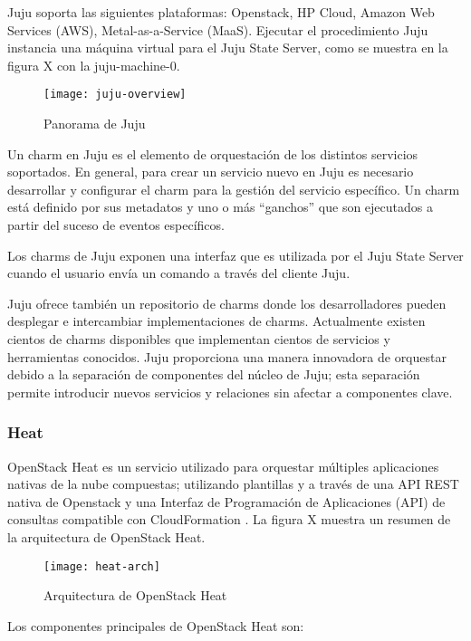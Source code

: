 Juju soporta las siguientes plataformas: Openstack, HP Cloud, Amazon Web Services (AWS), Metal-as-a-Service (MaaS). Ejecutar el procedimiento Juju instancia una máquina virtual  para el Juju State Server, como se muestra en la figura X con la juju-machine-0.


\begin{figure}[H]
    \centering
    \texttt{[image: juju-overview]}
    \caption{ Panorama de Juju \protect\cite{Metsch2013-et}}
    \label{fig:juju-overview}
\end{figure}

Un charm en Juju es el elemento de orquestación de los distintos servicios soportados. En general, para crear un servicio nuevo en Juju es necesario desarrollar y configurar el charm para la gestión del servicio específico. Un charm está definido por sus metadatos y uno o más “ganchos” que son ejecutados a partir del suceso de eventos específicos. 

Los charms de Juju exponen una interfaz que es utilizada por el Juju State Server cuando el usuario envía un comando a través del cliente Juju. 

Juju ofrece también un repositorio de charms donde los desarrolladores pueden desplegar e intercambiar implementaciones de charms. Actualmente existen cientos de charms disponibles que implementan cientos de servicios y herramientas conocidos. Juju proporciona una manera innovadora de orquestar debido a la separación de componentes del núcleo de Juju; esta separación permite introducir nuevos servicios y relaciones sin afectar a componentes clave.


\subsubsection{Heat}

OpenStack Heat es un servicio utilizado para orquestar múltiples aplicaciones nativas de la nube compuestas; utilizando plantillas y a través de una API REST nativa de Openstack y una Interfaz de Programación de Aplicaciones (API) de consultas compatible con CloudFormation \cite{Rackspace2016-jh}. La figura X muestra un resumen de la arquitectura de OpenStack Heat.
\begin{figure}[h!]
    \centering
    \texttt{[image: heat-arch]}
    \caption{ Arquitectura de OpenStack Heat \protect\cite{Metsch2013-et}}
    \label{fig:heat-arch}
\end{figure}
Los componentes principales de OpenStack Heat son:

